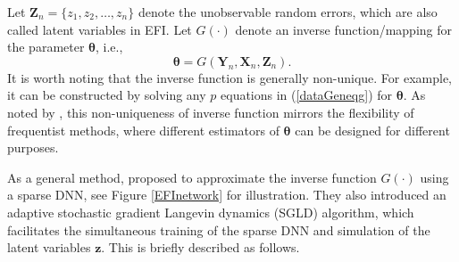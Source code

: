 \documentclass[11pt]{article}
\newcommand{\bX}{{\boldsymbol X}}
\newcommand{\bY}{{\boldsymbol Y}}
\newcommand{\bz}{{\boldsymbol z}}
\newcommand{\bZ}{{\boldsymbol Z}}
\newcommand{\btheta}{{\boldsymbol \theta}}
\begin{document}
Let $\bZ_n=\{z_1,z_2,\ldots,z_n\}$ denote the unobservable random errors,
which are also called latent variables in EFI.  
Let $G(\cdot)$ denote an inverse function/mapping for the parameter $\btheta$, i.e., 
\begin{equation} \label{Inveq}
\btheta=G(\bY_n,\bX_n,\bZ_n).
\end{equation}
It is worth noting that the inverse function is generally non-unique. For example, it can be constructed by solving any $p$ equations in (\ref{dataGeneqg}) for $\btheta$. 
As noted by \cite{LiangKS2024EFI}, this non-uniqueness of inverse function 
mirrors the flexibility of frequentist methods, where different 
estimators of $\btheta$ can be designed for different purposes. 

As a general method, \cite{LiangKS2024EFI} proposed to approximate the inverse function $G(\cdot)$ using a sparse DNN, see Figure \ref{EFInetwork} for illustration.
They also introduced an adaptive stochastic gradient Langevin dynamics (SGLD) algorithm, which facilitates the  simultaneous 
training of the sparse DNN 
 and simulation of the latent variables $\bz$. This is briefly described  
 as follows. 

 
\end{document}
